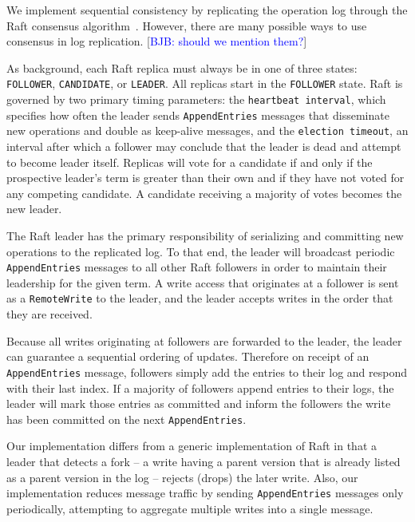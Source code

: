 \documentclass[10pt,conference,letterpaper]{IEEEtran}
\newcommand{\blue}[1]{{\textcolor{blue}{#1}}}
\newcommand{\bjb}[1]{[\blue{BJB: #1}]}
\begin{document}
We implement sequential consistency by replicating the operation log through the Raft
consensus algorithm~\cite{ongaro_search_2014}.
However, there are many possible ways to use consensus in log replication. \bjb{should we mention them?}

As background, each Raft replica must always be in one of three states: \texttt{FOLLOWER},
\texttt{CANDIDATE}, or \texttt{LEADER}.
All replicas start in the \texttt{FOLLOWER} state.
Raft is governed by two primary timing parameters: the \texttt{heartbeat interval}, which
specifies how often the leader sends \texttt{AppendEntries} messages that disseminate new
operations and double as
keep-alive messages, and the \texttt{election timeout}, an interval after which a follower
may conclude that the leader is dead and attempt to become leader itself.
Replicas will vote for a candidate if and only if the prospective leader's term is greater
than their own and if they have not voted for any competing candidate.
A candidate receiving a majority of votes becomes the new leader.

The Raft leader has the primary responsibility of serializing and committing new
operations to the replicated log.
To that end, the leader will broadcast periodic \texttt{AppendEntries} messages to all
other Raft followers in order to maintain their leadership for the given term.
A write access that originates at a follower is sent as a \texttt{RemoteWrite} to the
leader, and the leader accepts writes in the order that they are received.

Because all writes originating at followers are forwarded to the leader, the leader can
guarantee a sequential ordering of updates.
Therefore on receipt of an \texttt{AppendEntries} message, followers simply add the
entries to their log and respond with their last index.
If a majority of followers append entries to their logs, the leader will mark those
entries as committed and inform the followers the write has been committed on the next
\texttt{AppendEntries}.

Our implementation differs from a generic implementation of Raft in that
a leader that detects a
fork -- a write having a parent version that is already listed as a parent version in the
log -- rejects (drops) the later write.
Also, our implementation reduces message traffic by sending \texttt{AppendEntries}
messages only periodically, attempting to aggregate multiple writes into a single
message.

\end{document}
